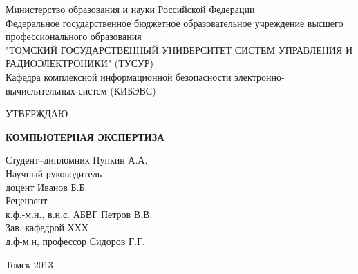 \begin{titlepage}
\newpage

\begin{center}
Министерство образования и науки Российской Федерации \\
\vspace{1cm}
Федеральное государственное бюджетное образовательное учреждение высшего профессионального образования\\
"ТОМСКИЙ ГОСУДАРСТВЕННЫЙ УНИВЕРСИТЕТ СИСТЕМ УПРАВЛЕНИЯ И РАДИОЭЛЕКТРОНИКИ" (ТУСУР) \\
\vspace{1cm}
Кафедра комплексной информационной безопасности электронно-вычислительных систем (КИБЭВС)\\
\end{center}

\begin{flushright}
УТВЕРЖДАЮ\\
\end{flushright}

\vspace{8em}

\begin{center}
\Large 
\end{center}

\vspace{2.5em}

\begin{center}
\textsc{\textbf{КОМПЬЮТЕРНАЯ ЭКСПЕРТИЗА}}
\end{center}

\vspace{6em}

\begin{flushleft}
Студент--дипломник \hrulefill Пупкин А.А. \\
\vspace{1.5em}
Научный руководитель \\
доцент \hrulefill Иванов Б.Б.\\
\vspace{1.5em}
Рецензент \\
к.ф.-м.н., в.н.с. АБВГ \hrulefill Петров В.В.\\
\vspace{1.5em}
Зав. кафедрой \No ХХХ \\
д.ф-м.н, профессор \hrulefill Сидоров Г.Г.
\end{flushleft}

\vspace{\fill}

\begin{center}
Томск 2013
\end{center}

\end{titlepage}
